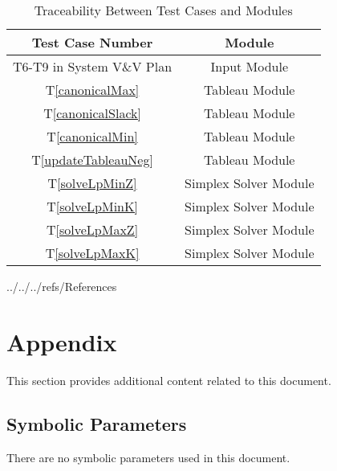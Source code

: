 \documentclass[12pt, titlepage]{article}
\newcommand{\tref}[1]{T\ref{#1}}
\begin{document}
\begin{table} [h!]
	\centering
	\begin{tabular}{|c|c|}
		\hline	
		\textbf{Test Case Number} & \textbf{Module}\\
		\hline 
		T6-T9 in System V\&V Plan& Input Module\\ \hline
		\tref{canonicalMax}& Tableau Module\\ \hline
		\tref{canonicalSlack}& Tableau Module\\ \hline
		\tref{canonicalMin}& Tableau Module\\ \hline
		\tref{updateTableauNeg}& Tableau Module\\ \hline
		\tref{solveLpMinZ}& Simplex Solver Module\\ \hline
		\tref{solveLpMinK}& Simplex Solver Module\\ \hline
		\tref{solveLpMaxZ}& Simplex Solver Module\\ \hline
		\tref{solveLpMaxK}& Simplex Solver Module\\ \hline
	\end{tabular}
	\caption{Traceability Between Test Cases and Modules}
	\label{Table:Traceability} 
\end{table}


\newpage


 {../../../refs/References}

\newpage

\section{Appendix}

This section provides additional content related to this document.

\subsection{Symbolic Parameters}

There are no symbolic parameters used in this document.
\end{document}
